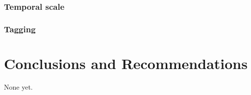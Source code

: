 \documentclass[letterpaper,portrait,11pt]{scrartcl}
\numberwithin{equation}{section}		%
\numberwithin{figure}{section}		%
\numberwithin{table}{section}				%
\begin{document}
\subsubsection{Temporal scale}


\subsubsection{Tagging}



\section{Conclusions and Recommendations}


None yet.




\printbibliography
\end{document}
